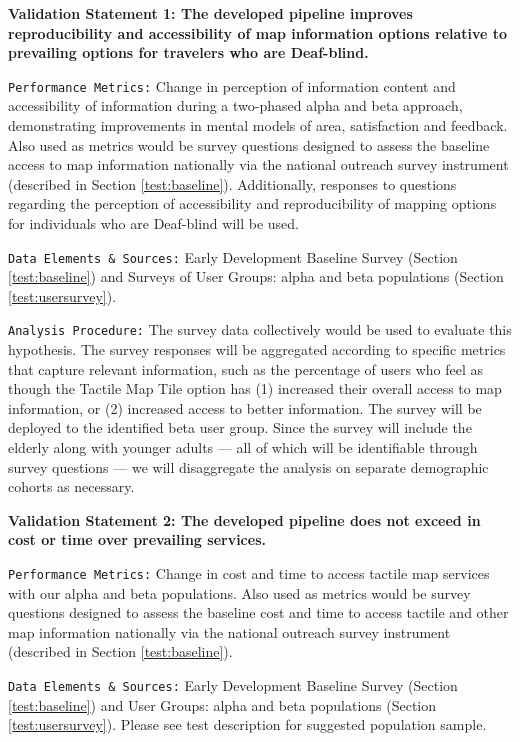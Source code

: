 \textbf{Validation Statement 1:
The developed pipeline improves reproducibility and accessibility of map information options relative to prevailing options for travelers who are Deaf-blind.}

\texttt{Performance Metrics:} Change in perception of information content and accessibility of information during a two-phased alpha and beta approach, demonstrating improvements in mental models of area, satisfaction and feedback. Also used as metrics would be survey questions designed to assess the baseline access to map information nationally via the national outreach survey instrument (described in Section \ref{test:baseline}). Additionally, responses to questions regarding the perception of accessibility and reproducibility of mapping options for individuals who are Deaf-blind will be used.

\texttt{Data Elements \& Sources:}
Early Development Baseline Survey (Section \ref{test:baseline}) and 
Surveys of User Groups: alpha and beta populations (Section \ref{test:usersurvey}).

\texttt{Analysis Procedure:}
The survey data collectively would be used to evaluate this hypothesis.  The survey responses will be aggregated according to specific metrics that capture relevant information, such as the percentage of users who feel as though the Tactile Map Tile option has (1) increased their overall access to map information, or (2) increased access to better information.  
The survey will be deployed to the identified beta user group. Since the survey will include the elderly along with younger adults — all of which will be identifiable through survey questions — we will disaggregate the analysis on separate demographic cohorts as necessary.

\textbf{Validation Statement 2:
The developed pipeline does not exceed in cost or time over prevailing services.}

\texttt{Performance Metrics:} Change in cost and time to access tactile map services with our alpha and beta populations. Also used as metrics would be survey questions designed to assess the baseline cost and time to access tactile and other map information nationally via the national outreach survey instrument (described in Section \ref{test:baseline}). 

\texttt{Data Elements \& Sources:}
Early Development Baseline Survey (Section \ref{test:baseline}) and 
User Groups: alpha and beta populations (Section \ref{test:usersurvey}). Please see test description for suggested population sample.

